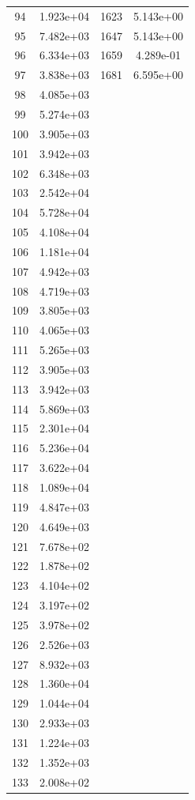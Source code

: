 \documentclass[12pt]{article}
\begin{document}
\begin{longtable}{@{}cccc@{}}
94 & 1.923e+04 & 1623 & 5.143e+00 \\
95 & 7.482e+03 & 1647 & 5.143e+00 \\
96 & 6.334e+03 & 1659 & 4.289e-01 \\
97 & 3.838e+03 & 1681 & 6.595e+00 \\
98 & 4.085e+03 &  &  \\
99 & 5.274e+03 &  &  \\
100 & 3.905e+03 &  &  \\
101 & 3.942e+03 &  &  \\
102 & 6.348e+03 &  &  \\
103 & 2.542e+04 &  &  \\
104 & 5.728e+04 &  &  \\
105 & 4.108e+04 &  &  \\
106 & 1.181e+04 &  &  \\
107 & 4.942e+03 &  &  \\
108 & 4.719e+03 &  &  \\
109 & 3.805e+03 &  &  \\
110 & 4.065e+03 &  &  \\
111 & 5.265e+03 &  &  \\
112 & 3.905e+03 &  &  \\
113 & 3.942e+03 &  &  \\
114 & 5.869e+03 &  &  \\
115 & 2.301e+04 &  &  \\
116 & 5.236e+04 &  &  \\
117 & 3.622e+04 &  &  \\
118 & 1.089e+04 &  &  \\
119 & 4.847e+03 &  &  \\
120 & 4.649e+03 &  &  \\
121 & 7.678e+02 &  &  \\
122 & 1.878e+02 &  &  \\
123 & 4.104e+02 &  &  \\
124 & 3.197e+02 &  &  \\
125 & 3.978e+02 &  &  \\
126 & 2.526e+03 &  &  \\
127 & 8.932e+03 &  &  \\
128 & 1.360e+04 &  &  \\
129 & 1.044e+04 &  &  \\
130 & 2.933e+03 &  &  \\
131 & 1.224e+03 &  &  \\
132 & 1.352e+03 &  &  \\
133 & 2.008e+02 &  &  \\

\end{longtable}
\end{document}
